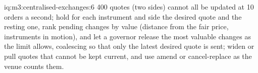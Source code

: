 \begin{solution}{iq:m3:centralised-exchanges:6}
400 quotes (two sides) cannot all be updated at 10 orders a second; hold for each instrument and side the
desired quote and the resting one, rank pending changes by value (distance from the fair price, instruments in
motion), and let a governor release the most valuable changes as the limit allows, coalescing so that only the
latest desired quote is sent; widen or pull quotes that cannot be kept current, and use amend or cancel-replace
as the venue counts them.
\end{solution}

